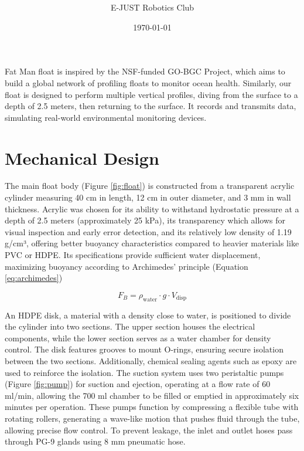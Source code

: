 \documentclass[11pt, twocolumn]{article}
\title{\Huge \color{mypink3}{ROV Document}  \vspace{0.5cm}}
\author{\Large E-JUST Robotics Club \normalsize \hspace{0.5cm} }
\date{\today}
\begin{document}
\twocolumn

Fat Man float is inspired by the NSF-funded GO-BGC Project, which aims to build a global network of profiling floats to monitor ocean health. Similarly, our float is designed to perform multiple vertical profiles, diving from the surface to a depth of 2.5 meters, then returning to the surface. It records and transmits data, simulating real-world environmental monitoring devices.

\section{Mechanical Design}

The main float body (Figure \ref{fig:float}) is constructed from a transparent acrylic cylinder measuring 40 cm in length, 12 cm in outer diameter, and 3 mm in wall thickness. Acrylic was chosen for its ability to withstand hydrostatic pressure at a depth of 2.5 meters (approximately 25 kPa), its transparency which allows for visual inspection and early error detection, and its relatively low density of 1.19 g/cm³, offering better buoyancy characteristics compared to heavier materials like PVC or HDPE. Its specifications provide sufficient water displacement, maximizing buoyancy according to Archimedes' principle (Equation \ref{eq:archimedes})

\begin{equation}
\label{eq:archimedes}
    F_B = \rho_{\text{water}} \cdot g \cdot V_{\text{disp}}
\end{equation}

An HDPE disk, a material with a density close to water, is positioned to divide the cylinder into two sections. The upper section houses the electrical components, while the lower section serves as a water chamber for density control. The disk features grooves to mount O-rings, ensuring secure isolation between the two sections. Additionally, chemical sealing agents such as epoxy are used to reinforce the isolation. The suction system uses two peristaltic pumps (Figure \ref{fig:pump}) for suction and ejection, operating at a flow rate of 60 ml/min, allowing the 700 ml chamber to be filled or emptied in approximately six minutes per operation. These pumps function by compressing a flexible tube with rotating rollers, generating a wave-like motion that pushes fluid through the tube, allowing precise flow control. To prevent leakage, the inlet and outlet hoses pass through PG-9 glands using 8 mm pneumatic hose. 
\end{document}
